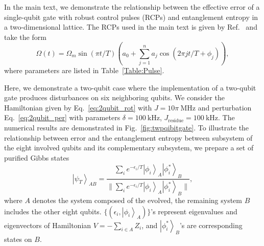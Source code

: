 \documentclass[12pt]{article}
\newcommand{\ket}[1]{\left|#1\right\rangle}
\begin{document}
In the main text, we demonstrate the relationship between the effective error of a single-qubit gate with robust control pulses (RCPs) and entanglement entropy in a two-dimensional lattice. The RCPs used in the main text is given by Ref.~\cite{hai2025scalablerobustquantumcontrol} and take the form
\begin{equation}
\Omega(t) = \Omega_m\sin(\pi t/T)(a_0+\sum_{
j=1}^n a_j \cos(2\pi jt/T+\phi_j)),
\end{equation} 
where parameters are listed in Table~\ref{Table:Pulse}.




Here, we demonstrate a two-qubit case where the implementation of a two-qubit gate produces disturbances on six neighboring qubits. 
We consider the Hamiltonian given by Eq.~\eqref{eq:2qubit_rot} with $J=10\pi~\mathrm{MHz}$ and perturbation Eq.~\eqref{eq:2qubit_per} with parameters $\delta =100~\mathrm{kHz}$, $J_{\mathrm{residue}}=100~\mathrm{kHz}$. The numerical results are demonstrated in Fig.~\ref{fig:twpqibitgate}. To illustrate the relationship between error and the entanglement entropy between subsystem of the eight involved qubits and its complementary subsystem, we prepare a set of purified Gibbs states
\begin{equation}
    \ket{\psi_T}_{AB}=\dfrac{\sum_ie^{-\epsilon_i/T}\ket{\phi_i}_A\ket{\phi^*_i}_{B}}{\|\sum_ie^{-\epsilon_i/T}\ket{\phi_i}_A\ket{\phi^*_i}_{B}\|},\label{Apendix:gibs}
\end{equation}
where $A$ denotes the system composed of the evolved, the remaining system $B$ includes the other eight qubits. $\{(\epsilon_i,\ket{\phi_i}_{A})\}$'s represent eigenvalues and eigenvectors of Hamiltonian $V=-\sum_{i\in A}Z_i$, and $\ket{\phi^*_i}_{B}$'s are corresponding states on $B$. 
\end{document}
